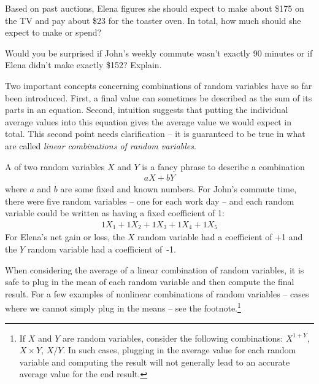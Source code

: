\begin{exercisewrap}
\begin{nexercise}
Based on past auctions, Elena figures she should expect to make about \$175 on the TV and pay about \$23 for the toaster oven. In total, how much should she expect to make or spend?\footnotemark
\end{nexercise}
\end{exercisewrap}

\begin{exercisewrap}
\begin{nexercise} \label{explainWhyThereIsUncertaintyInTheSum}
Would you be surprised if John's weekly commute wasn't exactly 90 minutes or if Elena didn't make exactly \$152? Explain.\footnotemark
\end{nexercise}
\end{exercisewrap}

Two important concepts concerning combinations of random variables have so far been introduced. First, a final value can sometimes be described as the sum of its parts in an equation. Second, intuition suggests that putting the individual average values into this equation gives the average value we would expect in total. This second point needs clarification -- it is guaranteed to be true in what are called \emph{linear combinations of random variables}.

A  of two random variables $X$ and $Y$ is a fancy phrase to describe a combination
\begin{align*}
aX + bY
\end{align*}
where $a$ and $b$ are some fixed and known numbers. For John's commute time, there were five random variables -- one for each work day -- and each random variable could be written as having a fixed coefficient of 1:
\begin{align*}
1X_1 + 1 X_2 + 1 X_3 + 1 X_4 + 1 X_5
\end{align*}
For Elena's net gain or loss, the $X$ random variable had
a coefficient of +1 and the $Y$ random variable had
a coefficient of~-1.

\D{\newpage}

When considering the average of a linear combination of random variables, it is safe to plug in the mean of each random variable and then compute the final result. For a few examples of nonlinear combinations of random variables -- cases where we cannot simply plug in the means -- see the footnote.\footnote{If $X$ and $Y$ are random variables, consider the following combinations: $X^{1+Y}$, $X\times Y$, $X/Y$. In such cases, plugging in the average value for each random variable and computing the result will not generally lead to an accurate average value for the end result.}

